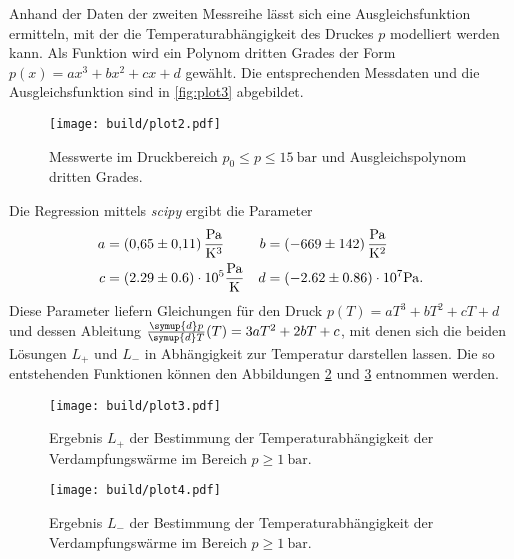 Anhand der Daten der zweiten Messreihe lässt sich eine Ausgleichsfunktion ermitteln, mit der die Temperaturabhängigkeit des Druckes $p$ modelliert werden kann.
Als Funktion wird ein Polynom dritten Grades der Form $p(x) = ax^3 + bx^2 + cx + d$ gewählt. Die entsprechenden Messdaten und die Ausgleichsfunktion sind
in \autoref{fig:plot3} abgebildet. 

\begin{figure}
    \centering
    \texttt{[image: build/plot2.pdf]}
    \caption{Messwerte im Druckbereich $p_0 \leq p \leq \qty{15}{\bar}$ und Ausgleichspolynom dritten Grades.}
    \label{fig:plot2}
\end{figure}

Die Regression mittels \textit{scipy} \cite{scipy} ergibt die Parameter
\begin{align*}
    a &= \qty{0.65 +- 0.11}{\pascal\per\cubic\kelvin} & b &= \qty{-669 +- 142}{\pascal\per\kelvin\squared} \\
    c &= (2.29 \pm 0.6) \cdot 10^5 \unit{\pascal\per\kelvin}     & d &= (-2.62 \pm 0.86) \cdot 10^7 \unit{\pascal}. \\ 
\end{align*}
Diese Parameter liefern Gleichungen für den Druck $p(T) = aT^3 + bT^2 + cT + d$ und dessen Ableitung $\frac{\symup{d}p}{\symup{d}T}(T) = 3aT^2 + 2bT + c$, mit denen 
sich die beiden Lösungen $L_+$ und $L_-$ in Abhängigkeit zur Temperatur darstellen lassen. Die so entstehenden Funktionen können den Abbildungen \ref{fig:plot3} und 
\ref{fig:plot4} entnommen werden.

\begin{figure}
    \centering
    \texttt{[image: build/plot3.pdf]}
    \caption{Ergebnis $L_+$ der Bestimmung der Temperaturabhängigkeit der Verdampfungswärme im Bereich $p \geq \qty{1}{\bar}$.}
    \label{fig:plot3}
\end{figure}

\begin{figure}
    \centering
    \texttt{[image: build/plot4.pdf]}
    \caption{Ergebnis $L_-$ der Bestimmung der Temperaturabhängigkeit der Verdampfungswärme im Bereich $p \geq \qty{1}{\bar}$.}
    \label{fig:plot4}
\end{figure}

